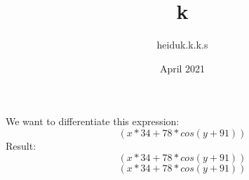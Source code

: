 \documentclass{article}
\title{k}
\author{heiduk.k.k.s }
\date{April 2021}
\begin{document}
\maketitle
\centering
We want to differentiate this expression:
$$ (x*34+78*cos(y+91))$$
\centering
Result:
$$ (x*34+78*cos(y+91))$$
$$ (x*34+78*cos(y+91))$$
\end{document}

